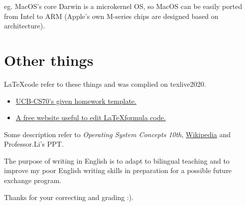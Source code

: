 \documentclass[11pt]{article}
\begin{document}
eg. MacOS's core Darwin is a microkernel OS, so MacOS can be easily ported from Intel to ARM
(Apple's own M-series chips are designed based on architecture).

\section*{Other things}

\LaTeX \space code refer to these things and was complied on texlive2020.
\begin{itemize}
    \item  \href{https://www.eecs70.org/assets/misc/homework_template.tex}{UCB-CS70's given homework template.} 
    \item  \href{https://www.latexlive.com}{A free website useful to edit \LaTeX \space formula code.}
\end{itemize}

Some description refer to \textit{Operating System Concepts 10th}, \href{https://en.wikipedia.org}{Wikipedia} and Professor.Li's PPT.

The purpose of writing in English is to adapt to bilingual teaching and to improve my poor English 
writing skills in preparation for a possible future exchange program. 

Thanks for your correcting and grading :).
\end{document}
